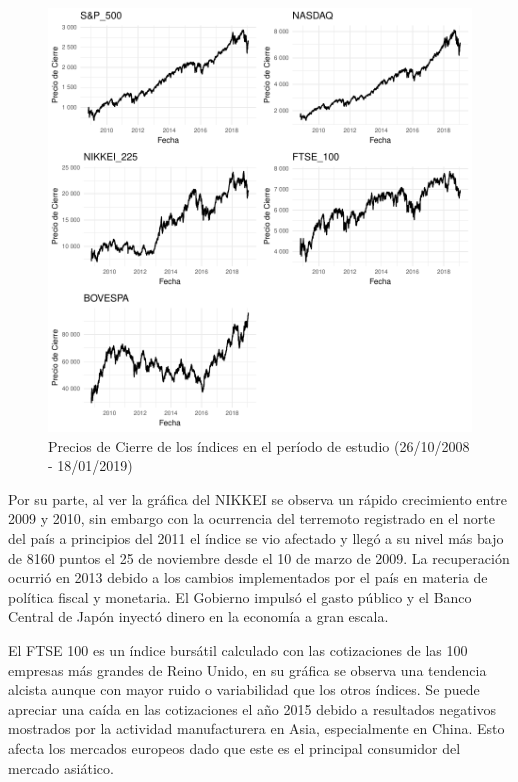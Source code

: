 \documentclass[a4paper,12pt]{Latex/Classes/PhDthesisPSnPDF}
\begin{document}
\begin{figure}[H]
\centering
\includegraphics{main-005}
\caption{Precios de Cierre de los índices en el período de estudio (26/10/2008 - 18/01/2019)}
\end{figure}

Por su parte, al ver la gráfica del NIKKEI se observa un rápido crecimiento entre 2009 y 2010, sin embargo con la ocurrencia del terremoto registrado en el norte del país a principios del 2011 el índice se vio afectado y llegó a su nivel más bajo de 8160 puntos el 25 de noviembre desde el 10 de marzo de 2009. La recuperación ocurrió en 2013 debido a los cambios implementados por el país en materia de política fiscal y monetaria. El Gobierno impulsó el gasto público y el Banco Central de Japón inyectó dinero en la economía a gran escala.

El FTSE 100 es un índice bursátil calculado con las cotizaciones de las 100 empresas más grandes de Reino Unido, en su gráfica se observa una tendencia alcista aunque con mayor ruido o variabilidad que los otros índices. Se puede apreciar una caída en las cotizaciones el año 2015 debido a resultados negativos mostrados por la actividad manufacturera en Asia, especialmente en China. Esto afecta los mercados europeos dado que este es el principal consumidor del mercado asiático.
\end{document}
